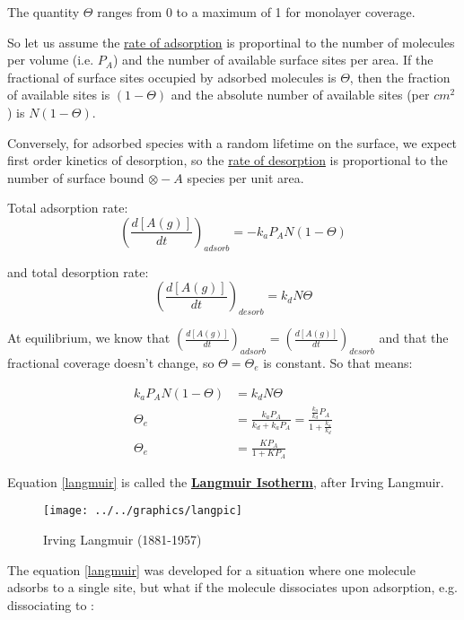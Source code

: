 \documentclass[ignorenonframetext]{beamer}
\begin{document}
The quantity \(\Theta\) ranges from 0 to a maximum of 1 for monolayer coverage.

So let us assume the \underline{rate of adsorption} is proportinal to the number of molecules per volume (i.e. \(P_A\)) and the number of available surface sites per area. If the fractional of surface sites occupied by adsorbed molecules is \(\Theta\), then the fraction of available sites is \((1-\Theta)\) and the absolute number of available sites (per \(cm^2\)) is \(N(1-\Theta)\).

Conversely, for adsorbed species with a random lifetime on the surface, we expect first order kinetics of desorption, so the \underline{rate of desorption} is proportional to the number of surface bound \(\otimes-A\) species per unit area.

Total adsorption rate:
\begin{equation}
\left(\frac{d[A(g)]}{dt}\right)_{adsorb} = -k_aP_AN(1-\Theta)
\end{equation}

and total desorption rate:
\begin{equation}
\left(\frac{d[A(g)]}{dt}\right)_{desorb} = k_dN\Theta
\end{equation}

At equilibrium, we know that \(\left(\frac{d[A(g)]}{dt}\right)_{adsorb}=\left(\frac{d[A(g)]}{dt}\right)_{desorb}\) and that the fractional coverage doesn't change, so \(\Theta = \Theta_e\) is constant. So that means:

\begin{align}
k_aP_AN(1-\Theta)&=k_dN\Theta \\
\Theta_e &= \frac{k_aP_A}{k_d + k_aP_A} = \frac{\frac{k_a}{k_d} P_A}{1 + \frac{k_a}{k_d}}\\
\Theta_e &=\frac{KP_A}{1+KP_A}\label{langmuir}
\end{align}

Equation \ref{langmuir} is called the \textbf{\underline{Langmuir Isotherm}}, after Irving Langmuir.

\begin{figure}[H]
\centering
\texttt{[image: ../../graphics/langpic]}
\caption{Irving Langmuir  (1881-1957)}
\end{figure}

The equation \ref{langmuir} was developed for a situation where one molecule adsorbs to a single site, but what if the molecule dissociates upon adsorption, e.g.  dissociating to :
\end{document}

